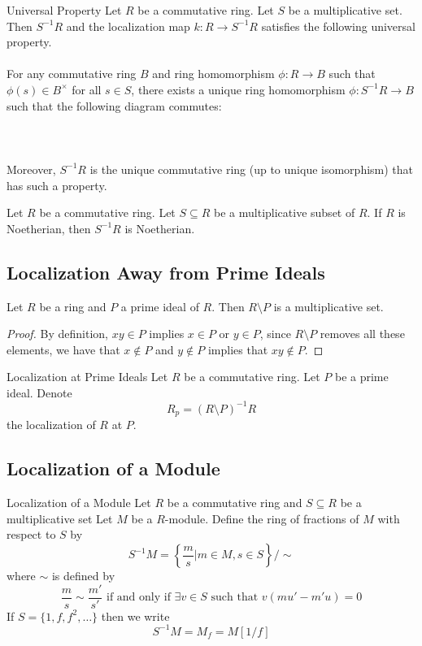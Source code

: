 \documentclass[a4paper]{article}
\begin{document}
\begin{prp}{Universal Property}{} Let $R$ be a commutative ring. Let $S$ be a multiplicative set. Then $S^{-1}R$ and the localization map $k:R\to S^{-1}R$ satisfies the following universal property. \\~\\

For any commutative ring $B$ and ring homomorphism $\phi:R\to B$ such that $\phi(s)\in B^\times$ for all $s\in S$, there exists a unique ring homomorphism $\phi:S^{-1}R\to B$ such that the following diagram commutes: \\~\\
 \\~\\
Moreover, $S^{-1}R$ is the unique commutative ring (up to unique isomorphism) that has such a property. 
\end{prp}

\begin{lmm}{}{} Let $R$ be a commutative ring. Let $S\subseteq R$ be a multiplicative subset of $R$. If $R$ is Noetherian, then $S^{-1}R$ is Noetherian. 
\end{lmm}

\subsection{Localization Away from Prime Ideals}
\begin{lmm}{}{} Let $R$ be a ring and $P$ a prime ideal of $R$. Then $R\setminus P$ is a multiplicative set. \tcbline
\begin{proof}
By definition, $xy\in P$ implies $x\in P$ or $y\in P$, since $R\setminus P$ removes all these elements, we have that $x\notin P$ and $y\notin P$ implies that $xy\notin P$. 
\end{proof}
\end{lmm}

\begin{defn}{Localization at Prime Ideals}{} Let $R$ be a commutative ring. Let $P$ be a prime ideal. Denote $$R_p=(R\setminus P)^{-1}R$$ the localization of $R$ at $P$. 
\end{defn}

\subsection{Localization of a Module}
\begin{defn}{Localization of a Module}{} Let $R$ be a commutative ring and $S\subseteq R$ be a multiplicative set Let $M$ be a $R$-module. Define the ring of fractions of $M$ with respect to $S$ by $$S^{-1}M=\left\{\frac{m}{s}|m\in M,s\in S\right\}/\sim$$ where $\sim$ is defined by $$\frac{m}{s}\sim\frac{m'}{s'}\text{ if and only if }\exists v\in S\text{ such that }v(mu'-m'u)=0$$ If $S=\{1,f,f^2,\dots\}$ then we write $$S^{-1}M=M_f=M[1/f]$$
\end{defn}
\end{document}
